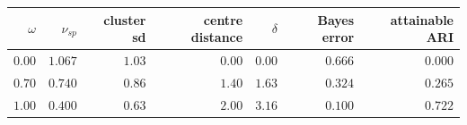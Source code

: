 \begin{tabular}{rrrrrrr}
\toprule
$\omega$ & $\nu_{sp}$ & cluster sd & centre distance & $\delta$ & Bayes error & attainable ARI \\
\midrule
$0.00$ & $1.067$ & $1.03$ & $0.00$ & $0.00$ & $0.666$ & $0.000$ \\
$0.70$ & $0.740$ & $0.86$ & $1.40$ & $1.63$ & $0.324$ & $0.265$ \\
$1.00$ & $0.400$ & $0.63$ & $2.00$ & $3.16$ & $0.100$ & $0.722$ \\
\bottomrule
\end{tabular}
